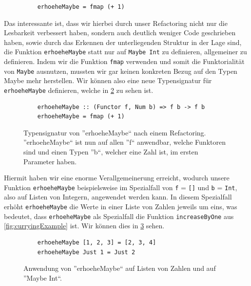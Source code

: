 \documentclass{hhuarticle}
\theoremstyle{definition}
\theoremstyle{theorem}
\begin{document}
  \begin{figure}[h]
    \begin{lstlisting}
    erhoeheMaybe = fmap (+ 1)
    \end{lstlisting}
    \caption{}%
    \label{fig:maybeTypeAnwenden2}
  \end{figure}

  Das interessante ist, dass wir hierbei durch unser Refactoring nicht
  nur die Lesbarkeit verbessert haben, sondern auch deutlich weniger
  Code geschrieben haben, sowie durch das Erkennen der unterliegenden
  Struktur in der Lage sind, die Funktion \verb|erhoeheMaybe| statt
  nur auf \verb|Maybe Int| zu definieren, allgemeiner zu definieren.
  Indem wir die Funktion \verb|fmap| verwenden und somit die Funktorialität
  von \verb|Maybe| ausnutzen, mussten wir gar keinen konkreten Bezug auf
  den Typen Maybe mehr herstellen. Wir können also eine neue Typensignatur
  für \verb|erhoeheMaybe| definieren, welche in \cref{fig:maybeTypeAnwenden3}
  zu sehen ist.

  \begin{figure}[h]
    \begin{lstlisting}
    erhoeheMaybe :: (Functor f, Num b) => f b -> f b
    erhoeheMaybe = fmap (+ 1)
    \end{lstlisting}
    \caption{Typensignatur von ''erhoeheMaybe`` nach einem Refactoring. ''erhoeheMaybe`` ist nun auf allen ''f`` anwendbar, welche Funktoren sind und einen Typen ''b``, welcher eine Zahl ist, im ersten Parameter haben. }%
    \label{fig:maybeTypeAnwenden3}
  \end{figure}

  Hiermit haben wir eine enorme Verallgemeinerung erreicht, wodurch unsere
  Funktion \verb|erhoeheMaybe| beispielsweise im Spezialfall von \verb|f| = \verb|[]|
  und \verb|b| = \verb|Int|, also auf Listen von Integern, angewendet werden kann.
  In diesem Spezialfall erhöht \verb|erhoeheMaybe| die Werte in einer Liste von Zahlen
  jeweils um eins, was bedeutet, dass \verb|erhoeheMaybe| als Spezialfall
  die Funktion \verb|increaseByOne| aus \cref{fig:curryingExample} ist.
  Wir können dies in \cref{fig:maybeTypeAnwenden4} sehen.

  \begin{figure}[h]
    \begin{lstlisting}
    erhoeheMaybe [1, 2, 3] = [2, 3, 4]
    erhoeheMaybe Just 1 = Just 2
    \end{lstlisting}
    \caption{Anwendung von ''erhoeheMaybe`` auf Listen von Zahlen und auf ''Maybe Int``.}%
    \label{fig:maybeTypeAnwenden4}
  \end{figure}
\end{document}
